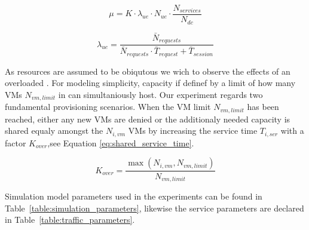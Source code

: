 \begin{equation}
\label{eq:service_rate}
\mu = K \cdot  \lambda_{ue} \cdot N_{ue} \cdot \frac{ N_{services}}{N_{dc}} 
\end{equation}

\begin{equation}
\label{eq:service_time}
\lambda_{ue} = \frac{ \bar{N}_{requests} }{\bar{N}_{requests} \cdot \bar{T}_{request} + \bar{T}_{session} }
\end{equation}

As resources are assumed to be obiqutous we wich to observe the effects of an overloaded \dc. For modeling simplicity, \dc capacity if definef by a limit of how many VMs $N_{vm,limit}$ in can simultaniously host. Our experiment regards two fundamental provisioning scenarios. When the VM limit $N_{vm,limit}$ has been reached, either any new VMs are denied or the additionaly needed \dc capacity is shared equaly amongst the $N_{i,vm}$ VMs by increasing the service time $T_{i,ser}$ with a factor $K_{over}$,see Equation \ref{eq:shared_service_time}.

\begin{equation}
\label{eq:shared_service_time}
K_{over} = \frac{ \max(N_{i,vm},N_{vm,limit}) }{ N_{vm,limit} }
\end{equation}



Simulation model parameters used in the experiments can be found in Table~\ref{table:simulation_parameters}, likewise the service parameters are declared in Table~\ref{table:traffic_parameters}.



